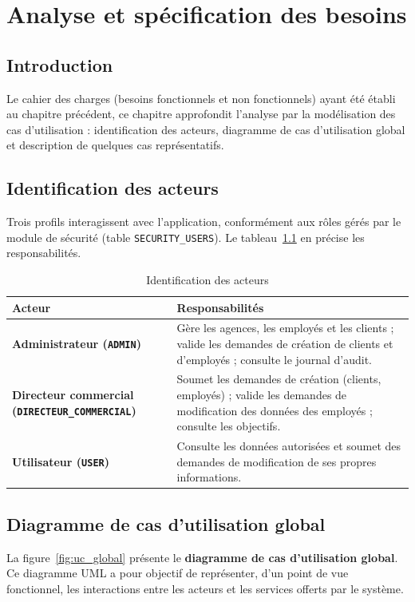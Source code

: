\chapter{Analyse et spécification des besoins}

\section*{Introduction}
Le cahier des charges (besoins fonctionnels et non fonctionnels) ayant été établi
au chapitre précédent, ce chapitre approfondit l'analyse par la modélisation des
cas d'utilisation : identification des acteurs, diagramme de cas d'utilisation
global et description de quelques cas représentatifs.

\section{Identification des acteurs}
Trois profils interagissent avec l'application, conformément aux rôles gérés par
le module de sécurité (table \texttt{SECURITY\_USERS}). Le
tableau~\ref{tab:acteurs} en précise les responsabilités.

\begin{table}[htbp]
\centering
\caption{Identification des acteurs}
\label{tab:acteurs}
\renewcommand{\arraystretch}{1.25}
\begin{tabularx}{\textwidth}{>{\bfseries}p{4cm}X}
\toprule
\textmd{\textbf{Acteur}} & \textbf{Responsabilités}\\
\midrule
Administrateur (\texttt{ADMIN}) & Gère les agences, les employés et les clients ;
valide les demandes de création de clients et d'employés ; consulte le journal
d'audit.\\
Directeur commercial (\texttt{DIRECTEUR\_COMMERCIAL}) & Soumet les demandes de
création (clients, employés) ; valide les demandes de modification des données
des employés ; consulte les objectifs.\\
Utilisateur (\texttt{USER}) & Consulte les données autorisées et soumet des
demandes de modification de ses propres informations.\\
\bottomrule
\end{tabularx}
\end{table}

\section{Diagramme de cas d'utilisation global}
La figure~\ref{fig:uc_global} présente le \textbf{diagramme de cas d'utilisation
global}. Ce diagramme UML a pour objectif de représenter, d'un point de vue
fonctionnel, les interactions entre les acteurs et les services offerts par le
système.

